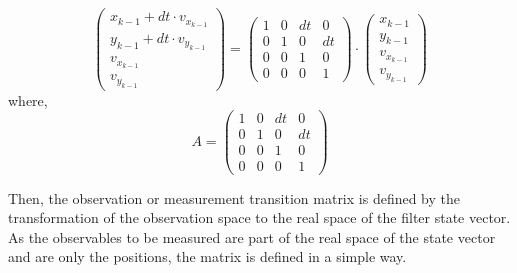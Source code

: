 \begin{equation}
\begin{pmatrix} x_{k-1} + dt\cdot v_{x_{k-1}} \\y_{k-1} + dt\cdot v_{y_{k-1}} \\ v_{x_{k-1}}  \\ v_{y_{k-1}} \end{pmatrix} =\begin{pmatrix}
1 & 0 & dt  & 0\\
0 & 1  & 0 & dt\\
0 & 0  & 1  & 0\\
0 & 0  & 0  & 1 
\end{pmatrix} \cdot \begin{pmatrix} x_{k-1}\\y_{k-1} \\ v_{x_{k-1}}  \\ v_{y_{k-1}} \end{pmatrix}
\end{equation}
where, 
\begin{equation}
A = 
\begin{pmatrix}
1 & 0 & dt  & 0\\
0 & 1  & 0 & dt\\
0 & 0  & 1  & 0\\
0 & 0  & 0  & 1 
\end{pmatrix}
\end{equation}

Then, the observation or measurement transition matrix is defined by the transformation of the observation space to the real space of the filter state vector. As the observables to be measured are part of the real space of the state vector and are only the positions, the matrix is defined in a simple way.


